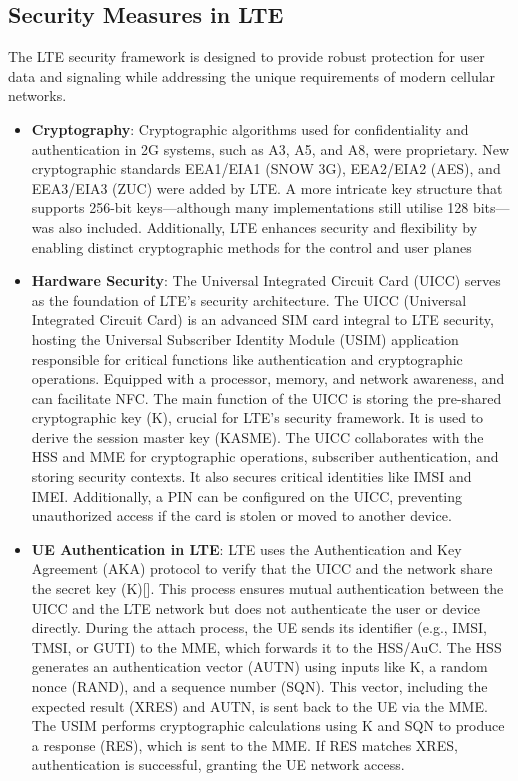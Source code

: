 \documentclass[conference]{IEEEtran}
\begin{document}
\subsection{Security Measures in LTE}
The LTE security framework is designed to provide robust protection for user data and signaling while addressing the unique requirements of modern cellular networks.
\begin{itemize}
    \item \textbf{Cryptography}: 
    Cryptographic algorithms used for confidentiality and authentication in 2G systems, such as A3, A5, and A8, were proprietary. New cryptographic standards EEA1/EIA1 (SNOW 3G), EEA2/EIA2 (AES), and EEA3/EIA3 (ZUC) were added by LTE\cite{cichonski2016guide}. A more intricate key structure that supports 256-bit keys—although many implementations still utilise 128 bits—was also included. Additionally, LTE enhances security and flexibility by enabling distinct cryptographic methods for the control and user planes\cite{cao2013survey}

    \item \textbf{Hardware Security}: 
    The Universal Integrated Circuit Card (UICC) serves as the foundation of LTE's security architecture. The UICC (Universal Integrated Circuit Card) is an advanced SIM card integral to LTE security, hosting the Universal Subscriber Identity Module (USIM) application responsible for critical functions like authentication and cryptographic operations. Equipped with a processor, memory, and network awareness, and can facilitate NFC. The main function of the UICC is storing the pre-shared cryptographic key (K), crucial for LTE's security framework. It is used to derive the session master key (KASME). The UICC collaborates with the HSS and MME for cryptographic operations, subscriber authentication, and storing security contexts. It also secures critical identities like IMSI and IMEI. Additionally, a PIN can be configured on the UICC, preventing unauthorized access if the card is stolen or moved to another device\cite{cichonski2016guide}.

    \item \textbf{UE Authentication in LTE}: 
    LTE uses the Authentication and Key Agreement (AKA) protocol \cite{cao2013survey} to verify that the UICC and the network share the secret key (K)[]. This process ensures mutual authentication between the UICC and the LTE network but does not authenticate the user or device directly. During the attach process, the UE sends its identifier (e.g., IMSI, TMSI, or GUTI) to the MME, which forwards it to the HSS/AuC. The HSS generates an authentication vector (AUTN) using inputs like K, a random nonce (RAND), and a sequence number (SQN)\cite{cichonski2016guide}. This vector, including the expected result (XRES) and AUTN, is sent back to the UE via the MME. The USIM performs cryptographic calculations using K and SQN to produce a response (RES), which is sent to the MME. If RES matches XRES, authentication is successful, granting the UE network access\cite{cao2013survey}.


\end{itemize}
\end{document}
